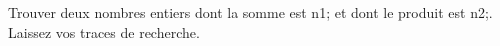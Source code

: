 \documentclass[exercice]{thedocument}%
\begin{document}
%
Trouver deux nombres entiers dont la somme est \<n1; et dont le produit est
\<n2;. Laissez vos traces de recherche.
\end{document}
